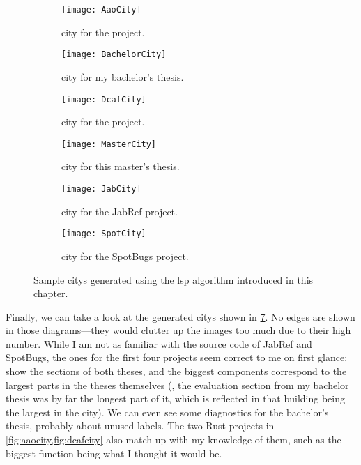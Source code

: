 \documentclass[../thesis]{subfiles}
\begin{document}
\begin{figure}
	\begin{subfigure}{0.5\textwidth}
		\centering
		\texttt{[image: AaoCity]}
		\caption{\Gls{city} for the  project.}\label{fig:aaocity}
	\end{subfigure}
	\begin{subfigure}{0.5\textwidth}
		\centering
		\texttt{[image: BachelorCity]}
		\caption{\Gls{city} for my bachelor's thesis.}\label{fig:bachcity}
	\end{subfigure}
	\begin{subfigure}{0.5\textwidth}
		\centering
		\texttt{[image: DcafCity]}
		\caption{\Gls{city} for the  project.}\label{fig:dcafcity}
	\end{subfigure}
	\begin{subfigure}{0.5\textwidth}
		\centering
		\texttt{[image: MasterCity]}
		\caption{\Gls{city} for this master's thesis.}\label{fig:mastercity}
	\end{subfigure}
	\begin{subfigure}{0.5\textwidth}
		\centering
		\texttt{[image: JabCity]}
		\caption{\Gls{city} for the JabRef project.}\label{fig:jabcity}
	\end{subfigure}
	\begin{subfigure}{0.5\textwidth}
		\centering
		\texttt{[image: SpotCity]}
		\caption{\Gls{city} for the SpotBugs project.}\label{fig:spotcity}
	\end{subfigure}
	\caption{Sample \glspl{city} generated using the \gls{lsp} algorithm introduced in this chapter.}\label{fig:gencities}
\end{figure}

Finally, we can take a look at the generated \glspl{city} shown in \cref{fig:gencities}.
No edges are shown in those diagrams---they would clutter up the images too much due to their high number.
While I am not as familiar with the source code of JabRef and SpotBugs, the ones for the first four projects seem correct to me on first glance:
 show the sections of both theses, and the biggest components correspond to the largest parts in the theses themselves (\eg, the evaluation section from my bachelor thesis was by far the longest part of it, which is reflected in that building being the largest in the \gls{city}).
We can even see some diagnostics for the bachelor's thesis, probably about unused labels.
The two Rust projects in \cref{fig:aaocity,fig:dcafcity} also match up with my knowledge of them, such as the biggest function being what I thought it would be.
\end{document}
